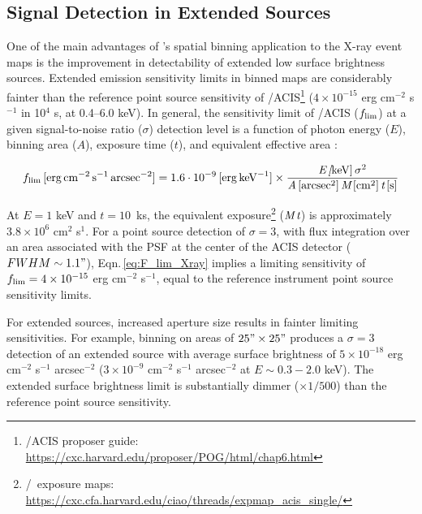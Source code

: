 \documentclass[modern]{aastex631}
\begin{document}
\subsection{Signal Detection in Extended Sources}
\label{Appendix:xray_SNR}

One of the main advantages of \SAUNAS's spatial binning application to the X-ray event maps is the improvement in detectability of extended low surface brightness sources. Extended emission sensitivity limits in binned maps are considerably fainter than the reference point source sensitivity of \Chandra/ACIS\footnote{\Chandra/ACIS proposer guide: \url{https://cxc.harvard.edu/proposer/POG/html/chap6.html}} ($4\times10^{-15}$ erg cm$^{-2}$ s$^{-1}$ in 10$^4$ s, at 0.4--6.0 keV). In general, the sensitivity limit of \Chandra/ACIS ($f_{\rm lim}$) at a given signal-to-noise ratio ($\sigma$) detection level is a function of photon energy ($E$), binning area ($A$), exposure time ($t$), and equivalent effective area \citep[$M$, which has a complex variation with energy, see Fig.\,6 in][]{evans+2010apj189_37}:

\begin{equation}
\label{eq:F_lim_Xray}
f_{\rm{lim}}\,[\rm{erg}\,\rm{cm}^{-2}\,\rm{s}^{-1}\,\rm{arcsec}^{-2} ] =\\ 1.6\cdot10^{-9}\,[\rm{erg} \, \rm{keV}^{-1}] \times\frac{\emph{E\,[\rm{keV}]}\,\sigma^2}{\emph{A}\,[arcsec^2]\,\emph{M}\,[cm^2]\,\emph{t}\,[s]}
\end{equation}

At $E=1$ keV and $t=10$~ks, the equivalent exposure\footnote{\ciao/\Chandra\ exposure maps: \url{https://cxc.cfa.harvard.edu/ciao/threads/expmap_acis_single/}} ($\emph{M}\,\emph{t}$) is approximately $3.8\times10^{6}$ cm$^{2}$ s$^{1}$. For a point source detection of $\sigma=3$, with flux integration over an area associated with the PSF at the center of the ACIS detector ($FWHM\sim1.1"$), Eqn.\,\ref{eq:F_lim_Xray} implies a limiting sensitivity of $f_{\rm{lim}} = 4\times10^{-15}$ erg cm$^{-2}$ s$^{-1}$, equal to the reference instrument point source sensitivity limits.

For extended sources, increased aperture size results in fainter limiting sensitivities. For example, binning on areas of $25"\times25"$ produces a $\sigma=3$ detection of an extended source with average surface brightness of $5\times10^{-18}$ erg cm$^{-2}$ s$^{-1}$ arcsec$^{-2}$ ($3\times10^{-9}$ cm$^{-2}$ s$^{-1}$ arcsec$^{-2}$ at $E\sim0.3-2.0$ keV). The extended surface brightness limit is substantially dimmer ($\times1/500$) than the reference point source sensitivity.
\end{document}
